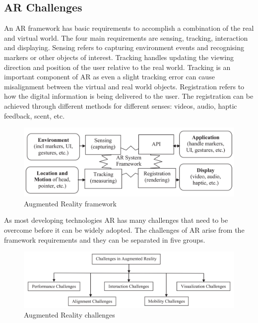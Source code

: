\documentclass[12pt, a4paper,oneside, nocenter]{thesis}
\begin{document}
\subsection{AR Challenges}
An AR framework has basic requirements to accomplish a combination of the real and virtual world.
The four main requirements are sensing, tracking, interaction and displaying. Sensing refers to
capturing environment events and recognising markers or other objects of interest. Tracking handles updating the
viewing direction and position of the user relative to the real world. Tracking is an important component
of AR as even a slight tracking error can cause misalignment between the virtual and real world objects\citep{ar-design}. 
Registration refers to how the digital information is being delivered to the user. The registration can be achieved
through different methods for different senses: videos, audio, haptic feedback, scent, etc.
\begin{figure}[H]
\includegraphics[width=\textwidth]{ar-framework}
\caption{Augmented Reality framework\citep{vrjournal}}
\label{fig:ar-framework}
\end{figure}
As most developing technologies AR has many challenges that need to be overcome before it can be widely adopted.
The challenges of AR arise from the framework requirements and they can be separated in five groups.
\begin{figure}[H]
\includegraphics[width=\textwidth]{ar-challenges}
\caption{Augmented Reality challenges\citep{Acta-Graphica}}
\label{fig:ar-challenges}
\end{figure}
\end{document}
